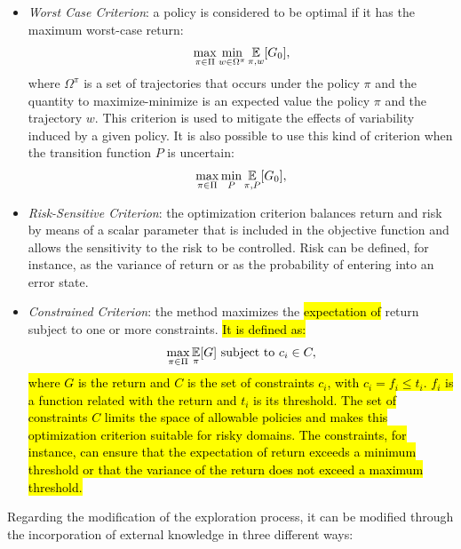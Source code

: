 \begin{itemize}
	\item \emph{Worst Case Criterion}: a policy is considered to be optimal if it has the maximum worst-case return:
	\begin{align}
	\max_{\pi \in \Pi}\min_{w \in \Omega^{\pi}} \operatorname*{\mathbb{E}}_{\pi, w}[G_{0}],
	\end{align}
	where $\Omega^{\pi}$ is a set of trajectories that occurs under the policy $\pi$ and the quantity to maximize-minimize is an expected value \wrt the policy $\pi$ and the trajectory $w$.	This criterion is used to mitigate the effects of variability induced by a given policy. It is also possible to use this kind of criterion when the transition function $P$ is uncertain:
	\begin{align}
	\max_{\pi \in \Pi}\min_{P} \operatorname*{\mathbb{E}}_{\pi, P}[G_{0}],
	\end{align}
	\item \emph{Risk-Sensitive Criterion}: the optimization criterion balances return and risk by means of a scalar parameter that is included in the objective function and allows the sensitivity to the risk to be controlled. Risk can be defined, for instance, as the variance of return or as the probability of entering into an error state.
	\item \emph{Constrained Criterion}: the method maximizes the \hl{expectation of} return subject to one or more constraints. \hl{It is defined as:}
	\begin{align}
		\max_{\pi \in \Pi} \operatorname*{\mathbb{E}}_{\pi}[G] \text{ subject to }c_i \in C,
	\end{align}
	\hl{where $G$ is the return and $C$ is the set of constraints $c_i$, with $c_i = f_i \leq t_i$. $f_i$ is a function related with the return and $t_i$ is its threshold. The set of constraints $C$ limits the space of allowable policies and makes this optimization criterion suitable for risky domains. The constraints, for instance, can ensure that the expectation of return exceeds a minimum threshold or that the variance of the return does not exceed a maximum threshold.}
	
\end{itemize}
Regarding the modification of the exploration process, it can be modified through the incorporation of external knowledge in three different ways:
